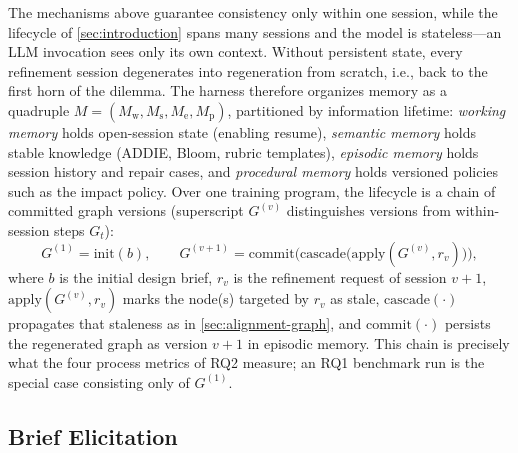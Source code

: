The mechanisms above guarantee consistency only within one session, while the lifecycle of \cref{sec:introduction} spans many sessions and the model is stateless---an LLM invocation sees only its own context. Without persistent state, every refinement session degenerates into regeneration from scratch, i.e., back to the first horn of the dilemma. The harness therefore organizes memory as a quadruple $M = (M_{\mathrm{w}}, M_{\mathrm{s}}, M_{\mathrm{e}}, M_{\mathrm{p}})$, partitioned by information lifetime: \emph{working memory} holds open-session state (enabling resume), \emph{semantic memory} holds stable knowledge (ADDIE, Bloom, rubric templates), \emph{episodic memory} holds session history and repair cases, and \emph{procedural memory} holds versioned policies such as the impact policy. Over one training program, the lifecycle is a chain of committed graph versions (superscript $G^{(v)}$ distinguishes versions from within-session steps $G_t$):
\[
G^{(1)} = \mathrm{init}(b), \qquad
G^{(v+1)} = \mathrm{commit}\Big(\mathrm{cascade}\big(\mathrm{apply}(G^{(v)}, r_v)\big)\Big),
\]
where $b$ is the initial design brief, $r_v$ is the refinement request of session $v{+}1$, $\mathrm{apply}(G^{(v)}, r_v)$ marks the node(s) targeted by $r_v$ as stale, $\mathrm{cascade}(\cdot)$ propagates that staleness as in \cref{sec:alignment-graph}, and $\mathrm{commit}(\cdot)$ persists the regenerated graph as version $v{+}1$ in episodic memory. This chain is precisely what the four process metrics of RQ2 measure; an RQ1 benchmark run is the special case consisting only of $G^{(1)}$.

\subsection{Brief Elicitation}
\label{sec:elicitation}

